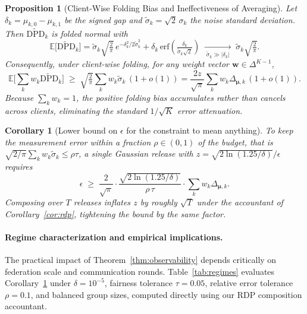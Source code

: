 \documentclass[preprint,12pt]{elsarticle}
\theoremstyle{plain}
\newtheorem{proposition}[theorem]{Proposition}
\newtheorem{corollary}[theorem]{Corollary}
\theoremstyle{definition}
\theoremstyle{remark}
\newcommand{\dpd}{\mathrm{DPD}}
\begin{document}
\begin{proposition}[Client-Wise Folding Bias and Ineffectiveness of Averaging]\label{prop:folding_bias}\label{lem:folded}
Let $\delta_k = \mu_{k,0} - \mu_{k,1}$ be the signed gap and $\tilde\sigma_k = \sqrt{2}\,\sigma_k$ the noise standard deviation. Then $\widetilde{\dpd}_k$ is folded normal with
\begin{equation}
\mathbb{E}\big[\widetilde{\dpd}_k\big] = \tilde\sigma_k\sqrt{\tfrac{2}{\pi}}\,e^{-\delta_k^2/2\tilde\sigma_k^2} + \delta_k\,\mathrm{erf}\!\left(\tfrac{\delta_k}{\tilde\sigma_k\sqrt{2}}\right) \;\xrightarrow[\;\tilde\sigma_k \gg \lvert\delta_k\rvert\;]{}\; \tilde\sigma_k\sqrt{\tfrac{2}{\pi}}.
\label{eq:folded}
\end{equation}
Consequently, under client-wise folding, for any weight vector $\bm{w} \in \Delta^{K-1}$,
\begin{equation}
\mathbb{E}\Big[\textstyle\sum_k w_k\widetilde{\dpd}_k\Big] \;\ge\; \sqrt{\tfrac{2}{\pi}}\sum_k w_k\tilde\sigma_k\,(1+o(1)) = \frac{2z}{\sqrt{\pi}}\sum_k w_k \Delta_{\bm{\mu},k}\,(1+o(1)).
\end{equation}
Because $\sum_k w_k = 1$, the positive folding bias accumulates rather than cancels across clients, eliminating the standard $1/\sqrt{K}$ error attenuation.
\end{proposition}

\begin{corollary}[Lower bound on $\epsilon$ for the constraint to mean anything]\label{cor:epsilon_floor}
To keep the measurement error within a fraction $\rho \in (0,1)$ of the budget, that is $\sqrt{2/\pi}\sum_k w_k\tilde\sigma_k \le \rho\tau$, a single Gaussian release with $z = \sqrt{2\ln(1.25/\delta)}/\epsilon$ requires
\begin{equation}
\epsilon \;\ge\; \frac{2}{\sqrt{\pi}}\cdot\frac{\sqrt{2\ln(1.25/\delta)}}{\rho\,\tau}\cdot\sum_k w_k \Delta_{\bm{\mu},k}.
\end{equation}
Composing over $T$ releases inflates $z$ by roughly $\sqrt{T}$ under the accountant of Corollary~\ref{cor:rdp}, tightening the bound by the same factor.
\end{corollary}

\paragraph{Regime characterization and empirical implications.} The practical impact of Theorem~\ref{thm:observability} depends critically on federation scale and communication rounds. Table~\ref{tab:regimes} evaluates Corollary~\ref{cor:epsilon_floor} under $\delta = 10^{-5}$, fairness tolerance $\tau = 0.05$, relative error tolerance $\rho = 0.1$, and balanced group sizes, computed directly using our RDP composition accountant.
\end{document}
